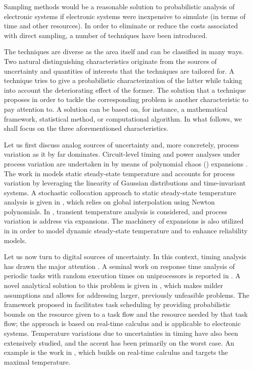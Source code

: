 Sampling methods would be a reasonable solution to probabilistic analysis of
electronic systems if electronic systems were inexpensive to simulate (in terms
of time and other resources). In order to eliminate or reduce the costs
associated with direct sampling, a number of techniques have been introduced.

The techniques are diverse as the area itself and can be classified in many
ways. Two natural distinguishing characteristics originate from the sources of
uncertainty and quantities of interests that the techniques are tailored for. A
technique tries to give a probabilistic characterization of the latter while
taking into account the deteriorating effect of the former. The solution that a
technique proposes in order to tackle the corresponding problem is another
characteristic to pay attention to. A solution can be based on, for instance, a
mathematical framework, statistical method, or computational algorithm. In what
follows, we shall focus on the three aforementioned characteristics.

Let us first discuss analog sources of uncertainty and, more concretely, process
variation as it by far dominates. Circuit-level timing and power analyses under
process variation are undertaken in \cite{bhardwaj2008} by means of polynomial
chaos () expansions \cite{xiu2010}. The work in \cite{juan2012} models
static steady-state temperature and accounts for process variation by leveraging
the linearity of Gaussian distributions and time-invariant systems. A stochastic
collocation \cite{xiu2010} approach to static steady-state temperature analysis
is given in \cite{lee2013}, which relies on global interpolation using Newton
polynomials. In \cite{ukhov2014}, transient temperature analysis is considered,
and process variation is address via  expansions. The machinery of
 expansions is also utilized in \cite{ukhov2015} in order to model
dynamic steady-state temperature \cite{ukhov2012} and to enhance reliability
models.

Let us now turn to digital sources of uncertainty. In this context, timing
analysis has drawn the major attention \cite{quinton2012}. A seminal work on
response time analysis of periodic tasks with random execution times on
uniprocessors is reported in \cite{diaz2002}. A novel analytical solution to
this problem is given in \cite{tanasa2015}, which makes milder assumptions and
allows for addressing larger, previously unfeasible problems. The framework
proposed in \cite{santinelli2011} facilitates task scheduling by providing
probabilistic bounds on the resource given to a task flow and the resource
needed by that task flow; the approach is based on real-time calculus and is
applicable to electronic systems. Temperature variations due to uncertainties in
timing have also been extensively studied, and the accent has been primarily on
the worst case. An example is the work in \cite{yang2013}, which builds on
real-time calculus and targets the maximal temperature.


